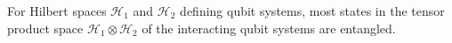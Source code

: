 For Hilbert spaces $\mathcal{H}_1$ and $\mathcal{H}_2$ defining qubit systems, most states in the tensor product space $\mathcal{H}_1 \otimes \mathcal{H}_2$ of the interacting qubit systems are entangled.

\begin{comment}
\begin{prop}
    The set of seperable states has measure 0.
\end{prop}


\begin{proof}[intuition]
    refer https://physics.stackexchange.com/questions/268831/are-there-more-entangled-states-or-non-entangled-ones 

    Consider a state $\ket{\psi} = a \ket{0} + b \ket{1} \in \mathcal{H}_1$, $a,b \in \mathbb{C}$. Since $a$ and $b$ are complex coefficients, we would have $4$ degrees of freedom to assign a particular $\ket{\psi}$. However including the constraints that $a^2 + b^2 = 1$ and that multiplying by global phase leaves the state unchanged, we are effectively left with $2$ degrees of freedom for assigning $\ket{\psi}$. 
    
Similarly assigning $\ket{\phi} \in \mathcal{H}_2$ has $2$ degrees of freedom.

    Consider the $4$-dimensional tensor space $\mathcal{H}_1 \otimes \mathcal{H}_2$. Since the state of any vector $\ket{\omega}$ in this space can be written as $\ket{\omega} = a \ket{00} + b \ket{01} + c \ket{10} + d \ket{11}$, where $a, b, c, d \in \mathbb{C}$ we have $8$ degrees of freedom initially for assigning the vector $\ket{\omega}$. Including constraint $a^2 + b^2 + c^2 + d^2 = 1$ and that multiplying by global phase leaves the state unchanged, we have $6$ degrees of freedom in assigning the value of $\ket{\omega}$ which is $2$ degrees of freedom more than $4 = 2 \times 2$ from the individual qubits.
\end{proof}
\end{comment}
